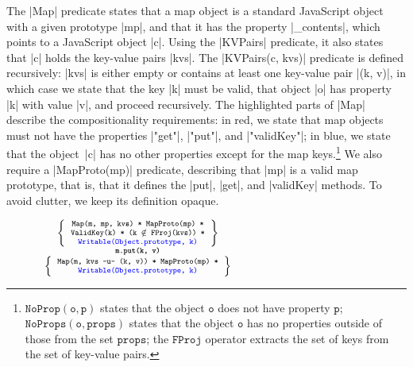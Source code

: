 \smallskip
The \jsinline|Map| predicate states that a map object is a standard JavaScript object with a given prototype \jsinline|mp|, and that it has the property \jsinline|_contents|, which points to a  JavaScript object \jsinline|c|.
Using the \jsinline|KVPairs| predicate, %
it also states that \jsinline|c| holds the key-value pairs \jsinline|kvs|. 
The \jsinline|KVPairs(c, kvs)| predicate is defined recursively: \jsinline|kvs| is either empty or contains at least one key-value pair \jsinline|(k, v)|, 
in which case we state that the key \jsinline|k| must be valid, that object \jsinline|o| has  property \jsinline|k| with value \jsinline|v|, and proceed recursively.
The highlighted parts of \jsinline|Map| describe the compositionality requirements: in red, we state that map objects must not have the properties \jsinline|"get"|, \jsinline|"put"|, and \jsinline|"validKey"|; in blue, we state that the object~\jsinline|c| has no other properties except for the map keys.\footnote{$\mathtt{NoProp(o, p)}$  states that the object $\mathtt{o}$ does not have property $\mathtt{p}$; $\mathtt{NoProps(o, props)}$ states that the object $\mathtt{o}$ has no properties outside of those from the set $\mathtt{props}$; the $\mathtt{FProj}$ operator extracts the set of keys from the set of key-value pairs.}
%
We also require a \jsinline|MapProto(mp)| predicate, describing that \jsinline|mp| is a valid map prototype, that is, that it defines the \jsinline|put|, \jsinline|get|, and \jsinline|validKey| methods. To avoid clutter, we keep its definition opaque.

\begin{figure}
\vspace*{0.1cm}
\hspace*{-0.8cm}
$
{\scriptsize
\begin{array}{c}
\left\{ {\begin{array}{c}
 \text{\texttt{Map(m, mp, kvs) * MapProto(mp) *}} \\
 \text{\texttt{ValidKey(k) * (k $\notin$ FProj(kvs)) *}} \\
 \text{\textcolor{blue}{\texttt{Writable(Object.prototype, k)}}}
\end{array}} \right\} \\
%
\text{\bfseries \texttt{m.put(k, v)}} \\[0.2mm]
%
\left\{ {\begin{array}{c}
 \text{\texttt{Map(m, kvs -u- (k, v)) * MapProto(mp) *}} \\
 \text{\textcolor{blue}{\texttt{Writable(Object.prototype, k)}}} \\
\end{array}} \right\}
\end{array}
} 
$
\vspace*{-0.3cm}
\end{figure}

